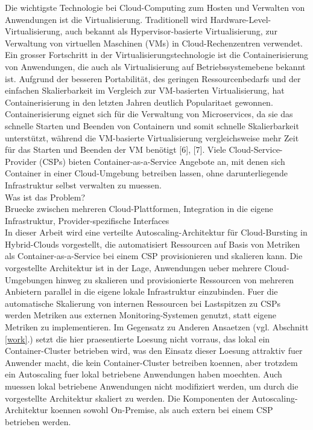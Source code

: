 \documentclass[runningheads]{llncs}
\begin{document}
Die wichtigste Technologie bei Cloud-Computing zum Hosten und Verwalten von Anwendungen ist die Virtualisierung. Traditionell wird Hardware-Level-Virtualisierung, auch bekannt als Hypervisor-basierte Virtualisierung, zur Verwaltung von virtuellen Maschinen (VMs) in Cloud-Rechenzentren verwendet. Ein grosser Fortschritt in der Virtualisierungstechnologie ist die Containerisierung von Anwendungen, die auch als Virtualisierung auf Betriebssystemebene bekannt ist. Aufgrund der besseren Portabilität, des geringen Ressourcenbedarfs und der einfachen Skalierbarkeit im Vergleich zur VM-basierten Virtualisierung, hat Containerisierung in den letzten Jahren deutlich Popularitaet gewonnen. Containerisierung eignet sich für die Verwaltung von Microservices, da sie das schnelle Starten und Beenden von Containern und somit schnelle Skalierbarkeit unterstützt, während die VM-basierte Virtualisierung vergleichsweise mehr Zeit für das Starten und Beenden der VM benötigt [6], [7]. Viele Cloud-Service-Provider (CSPs) bieten Container-as-a-Service Angebote an, mit denen sich Container in einer Cloud-Umgebung betreiben lassen, ohne darunterliegende Infrastruktur selbst verwalten zu muessen. \\

Was ist das Problem? \\
Bruecke zwischen mehreren Cloud-Plattformen, Integration in die eigene Infrastruktur, Provider-spezifische Interfaces \\

In dieser Arbeit wird eine verteilte Autoscaling-Architektur für Cloud-Bursting in Hybrid-Clouds vorgestellt, die automatisiert Ressourcen auf Basis von Metriken als Container-as-a-Service bei einem CSP provisionieren und skalieren kann. Die vorgestellte Architektur ist in der Lage, Anwendungen ueber mehrere Cloud-Umgebungen hinweg zu skalieren und provisionierte Ressourcen von mehreren Anbietern parallel in die eigene lokale Infrastruktur einzubinden. Fuer die automatische Skalierung von internen Ressourcen bei Lastspitzen zu CSPs werden Metriken aus externen Monitoring-Systemen genutzt, statt eigene Metriken zu implementieren. Im Gegensatz zu Anderen Ansaetzen (vgl. Abschnitt \ref{work}.) setzt die hier praesentierte Loesung nicht vorraus, das lokal ein Container-Cluster betrieben wird, was den Einsatz dieser Loesung attraktiv fuer Anwender macht, die kein Container-Cluster betreiben koennen, aber trotzdem ein Autoscaling fuer lokal betriebene Anwendungen haben moechten. Auch muessen lokal betriebene Anwendungen nicht modifiziert werden, um durch die vorgestellte Architektur skaliert zu werden. Die Komponenten der Autoscaling-Architektur koennen sowohl On-Premise, als auch extern bei einem CSP betrieben werden.
\end{document}
